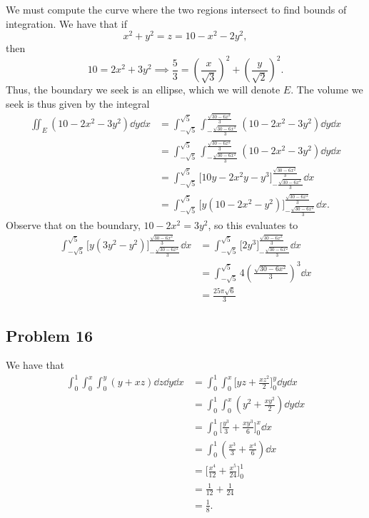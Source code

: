\documentclass[11pt]{article}
\begin{document}
We must compute the curve where the two regions intersect to find bounds of integration. We have that if
\[
	x^{2} + y^{2} = z = 10 - x^{2} - 2y^{2},
\]
then
\[
	10 = 2x^{2} + 3y^{2} \implies \frac{5}{3} = \left( \frac{x}{\sqrt{3}} \right)^{2} + \left( \frac{y}{\sqrt{2}} \right)^{2}.
\]
Thus, the boundary we seek is an ellipse, which we will denote $E$. The volume we seek is thus given by the integral
\begin{align*}
	\iint_{E} (10 - 2x^{2} - 3y^{2}) \dd{y} \dd{x} &= \int_{-\sqrt{5}}^{\sqrt{5}} \int_{-\frac{\sqrt{30 - 6x^{2}}}{3}}^{\frac{\sqrt{30 - 6x^{2}}}{3}} (10 - 2x^{2} - 3y^{2}) \dd{y} \dd{x} \\
	&= \int_{-\sqrt{5}}^{\sqrt{5}} \int_{-\frac{\sqrt{30 - 6x^{2}}}{3}}^{\frac{\sqrt{30 - 6x^{2}}}{3}} (10 - 2x^{2} - 3y^{2}) \dd{y} \dd{x} \\
	&= \int_{-\sqrt{5}}^{\sqrt{5}} \Big[ 10y - 2x^{2}y - y^{3} \Big]_{-\frac{\sqrt{30 - 6x^{2}}}{3}}^{\frac{\sqrt{30 - 6x^{2}}}{3}} \dd{x} \\
	&= \int_{-\sqrt{5}}^{\sqrt{5}} \Big[ y(10 - 2x^{2} - y^{2}) \Big]_{-\frac{\sqrt{30 - 6x^{2}}}{3}}^{\frac{\sqrt{30 - 6x^{2}}}{3}} \dd{x}.
\end{align*}
Observe that on the boundary, $10 - 2x^{2} = 3y^{2}$, so this evaluates to
\begin{align*}
	\int_{-\sqrt{5}}^{\sqrt{5}} \Big[ y(3y^{2} - y^{2}) \Big]_{-\frac{\sqrt{30 - 6x^{2}}}{3}}^{\frac{\sqrt{30 - 6x^{2}}}{3}} \dd{x} &= \int_{-\sqrt{5}}^{\sqrt{5}} \Big[ 2y^{3} \Big]_{-\frac{\sqrt{30 - 6x^{2}}}{3}}^{\frac{\sqrt{30 - 6x^{2}}}{3}} \dd{x} \\
	&= \int_{-\sqrt{5}}^{\sqrt{5}} 4 \left( \frac{\sqrt{30 - 6x^{2}}}{3} \right)^{3} \dd{x} \\
	&= \boxed{\frac{25\pi\sqrt{6}}{3}}
\end{align*}


\subsection*{Problem 16}

We have that
\begin{align*}
	\int_{0}^{1} \int_{0}^{x} \int_{0}^{y} (y + xz) \dd{z} \dd{y} \dd{x} &= \int_{0}^{1} \int_{0}^{x} \Big[ yz + \frac{xz^{2}}{2} \Big]_{0}^{y} \dd{y} \dd{x} \\
	&= \int_{0}^{1} \int_{0}^{x} \left( y^{2} + \frac{xy^{2}}{2} \right) \dd{y} \dd{x} \\
	&= \int_{0}^{1} \Big[ \frac{y^{3}}{3} + \frac{xy^{3}}{6} \Big]_{0}^{x} \dd{x} \\
	&= \int_{0}^{1} \left( \frac{x^{3}}{3} + \frac{x^{4}}{6} \right) \dd{x} \\
	&= \Big[ \frac{x^{4}}{12} + \frac{x^{5}}{24} \Big]_{0}^{1} \\
	&= \frac{1}{12} + \frac{1}{24} \\
	&= \boxed{\frac{1}{8}}.
\end{align*}
\end{document}
